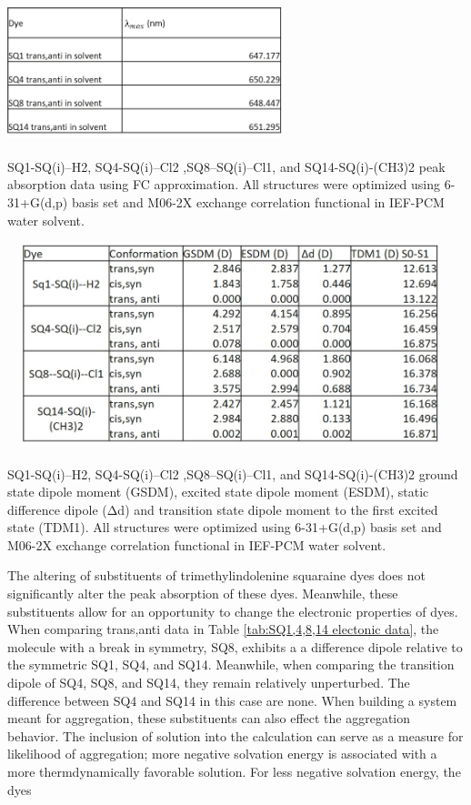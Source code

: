 \documentclass[journal=jacsat,manuscript=article]{achemso}
\begin{document}
{\newpage
\begin{table}[h]
    \centering
    \includegraphics[width=8cm,height=4cm]{figures/sq1_4_8_14-table.png}
    \caption{SQ1-SQ(i)--H2, SQ4-SQ(i)--Cl2 ,SQ8--SQ(i)--Cl1, and SQ14-SQ(i)-(CH3)2 peak absorption data using FC approximation. All structures were optimized using 6-31+G(d,p) basis set and M06-2X exchange correlation functional in IEF-PCM water solvent.}
    \label{tab:SQ1,4,8,14 lambda data}
\end{table}
\begin{table}[h]
    \centering
    \includegraphics[width=13cm,height=6cm]{SQ1_4_8_14_electronic_table.jpg}
        \caption{SQ1-SQ(i)--H2, SQ4-SQ(i)--Cl2 ,SQ8--SQ(i)--Cl1, and SQ14-SQ(i)-(CH3)2 ground state dipole moment (GSDM), excited state dipole moment (ESDM), static difference dipole (Δd) and transition state dipole moment to the first excited state (TDM1). All structures were optimized using 6-31+G(d,p) basis set and M06-2X exchange correlation functional in IEF-PCM water solvent.}
    \label{tab:SQ1,4,8,14 electonic data}
\end{table}
\newpage
The altering of substituents of trimethylindolenine squaraine dyes does not significantly alter the peak absorption of these dyes. Meanwhile, these substituents allow for an opportunity to change the electronic properties of dyes. When comparing trans,anti data in Table \ref{tab:SQ1,4,8,14 electonic data}, the molecule with a break in symmetry, SQ8, exhibits a a difference dipole relative to the symmetric SQ1, SQ4, and SQ14. Meanwhile, when comparing the transition dipole of SQ4, SQ8, and SQ14, they remain relatively unperturbed. The difference between SQ4 and SQ14 in this case are none. When building a system meant for aggregation, these substituents can also effect the aggregation behavior. The inclusion of solution into the calculation can serve as a measure for likelihood of aggregation; more negative solvation energy is associated with a more thermdynamically favorable solution. For less negative solvation energy, the dyes  
\newpage
\newpage
}
\end{document}
